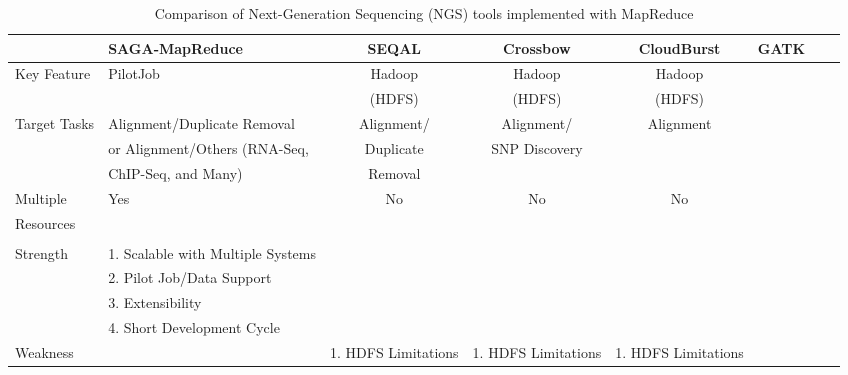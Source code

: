 \documentclass{sig-alternate}
\begin{document}
 

\begin{center}
\begin{table}[ht]
{\small
\hfill{}
\begin{tabular}{|l|l|c|c|c|c|c|c|}
\hline
  & \textbf{SAGA-MapReduce}\cite{pj_sagamr} & \textbf{SEQAL}\cite{seal2011} & \textbf{Crossbow}\cite{langmead2009} & \textbf{CloudBurst}\cite{cloudburst} & \textbf{GATK}\cite{gatk} \\ \hline
 \hline 
 Key Feature & PilotJob   &  Hadoop  &  Hadoop & Hadoop & \\ 
  &   & (HDFS)  &  (HDFS) & (HDFS) & \\ \hline
Target Tasks & Alignment/Duplicate Removal & Alignment/ & Alignment/ & Alignment & \\
       &  or Alignment/Others (RNA-Seq, & Duplicate & SNP Discovery & & \\ 
        & ChIP-Seq, and Many) &  Removal & &  & \\ \hline  
Multiple  & Yes  & No  & No & No  &\\
Resources   & &  &   &  &\\  &  &  &  &  & \\ \hline

Strength & 1. Scalable with Multiple Systems  &  &  &  & \\ 

&  2. Pilot Job/Data Support & &  & & \\ 
&3. Extensibility  &  &  &  & \\
& 4. Short Development Cycle & & & & \\\hline
Weakness &  & 1. HDFS Limitations & 1. HDFS Limitations & 1. HDFS Limitations  &\\ \hline

\hline
\end{tabular}}
\hfill{}
\caption{Comparison of Next-Generation Sequencing (NGS) tools implemented with MapReduce}
 \label{table:mr-comparison}
\end{table}
\end{center}
\end{document}
